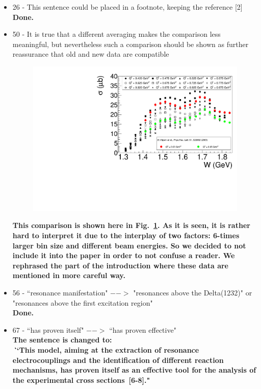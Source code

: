 \documentclass[,superscriptaddress,showpacs,amssymb,amsmath,amsfonts,linenumbers,article]{revtex4-1}
\begin{document}
\begin{itemize}


\item 26 - This sentence could be placed in a footnote, keeping the reference [2]\\
{\bf Done.}

\item 50 - It is true that a different averaging makes the comparison less meaningful, but nevertheless such a comparison should be shown as further reassurance that old and new data are compatible

\begin{figure}[htp!]
\begin{center}
 \includegraphics[width=14cm,keepaspectratio]{rip_compare.pdf}
 \caption{\label{rip_compare}}
\end{center}
\end{figure} 

{\bf
This comparison is shown here in Fig.~\ref{rip_compare}. As it is seen, it is rather hard to interpret it due to the interplay of two factors: 6-times larger bin size and different beam energies. So we decided to not include it into the paper in order to not confuse a reader. We rephrased the part of the introduction where these data are mentioned in more careful way.
}


\item 56 - ``resonance manifestation" $-->$ "resonances above the Delta(1232)" or "resonances above the first excitation region"\\
{\bf Done.}


\item 67 - ``has proven itself" $-->$ ``has proven effective"\\
{\bf The sentence is changed to:\\
\textbf{\textit ``This model, aiming at the extraction of resonance electrocouplings and the identification of different reaction mechanisms, has proven itself as an effective tool for the analysis of the experimental cross sections~[6-8]."}}


\end{itemize}
\end{document}
